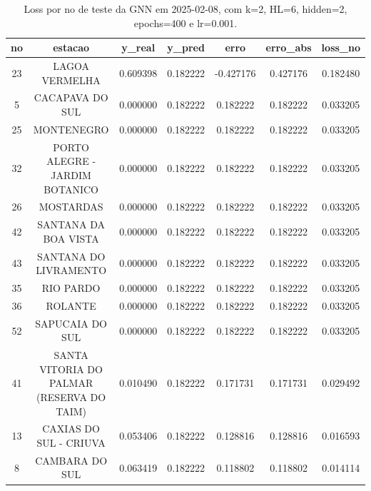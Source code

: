 \begin{table}[h]
\centering
\caption{Loss por no de teste da GNN em 2025-02-08, com k=2, HL=6, hidden=2, epochs=400 e lr=0.001.}
\label{tab:gnn_loss_k2_hl6_h2_e400_d20250208}
\begin{tabular}{ccccccc}
\toprule
no & estacao & y\_real & y\_pred & erro & erro\_abs & loss\_no \\
\midrule
23 & LAGOA VERMELHA & 0.609398 & 0.182222 & -0.427176 & 0.427176 & 0.182480 \\
5 & CACAPAVA DO SUL & 0.000000 & 0.182222 & 0.182222 & 0.182222 & 0.033205 \\
25 & MONTENEGRO & 0.000000 & 0.182222 & 0.182222 & 0.182222 & 0.033205 \\
32 & PORTO ALEGRE - JARDIM BOTANICO & 0.000000 & 0.182222 & 0.182222 & 0.182222 & 0.033205 \\
26 & MOSTARDAS & 0.000000 & 0.182222 & 0.182222 & 0.182222 & 0.033205 \\
42 & SANTANA DA BOA VISTA & 0.000000 & 0.182222 & 0.182222 & 0.182222 & 0.033205 \\
43 & SANTANA DO LIVRAMENTO & 0.000000 & 0.182222 & 0.182222 & 0.182222 & 0.033205 \\
35 & RIO PARDO & 0.000000 & 0.182222 & 0.182222 & 0.182222 & 0.033205 \\
36 & ROLANTE & 0.000000 & 0.182222 & 0.182222 & 0.182222 & 0.033205 \\
52 & SAPUCAIA DO SUL & 0.000000 & 0.182222 & 0.182222 & 0.182222 & 0.033205 \\
41 & SANTA VITORIA DO PALMAR (RESERVA DO TAIM) & 0.010490 & 0.182222 & 0.171731 & 0.171731 & 0.029492 \\
13 & CAXIAS DO SUL - CRIUVA & 0.053406 & 0.182222 & 0.128816 & 0.128816 & 0.016593 \\
8 & CAMBARA DO SUL & 0.063419 & 0.182222 & 0.118802 & 0.118802 & 0.014114 \\
\bottomrule
\end{tabular}
\end{table}

